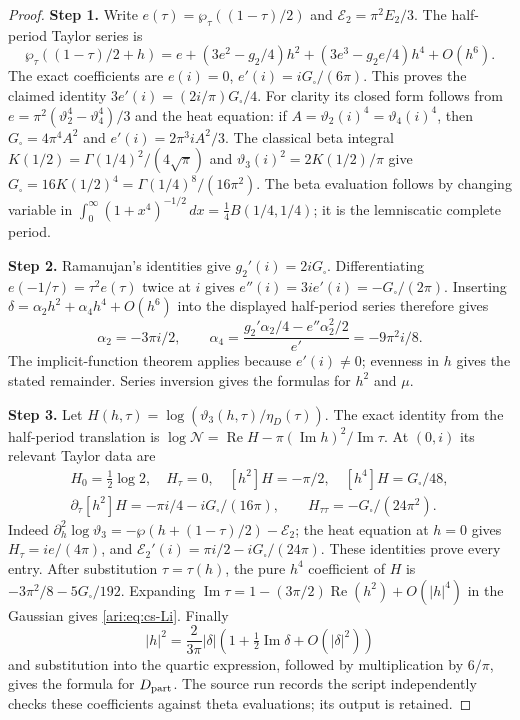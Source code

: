 \documentclass[11pt,a4paper]{article}
\theoremstyle{plain}
\theoremstyle{definition}
\begin{document}
\begin{proof}
\noindent\textbf{Step 1.} Write $e(\tau)=\wp_\tau((1-\tau)/2)$ and
$\mathcal E_2=\pi^2E_2/3$. The half-period Taylor series is
\[
 \wp_\tau((1-\tau)/2+h)
 =e+(3e^2-g_2/4)h^2+(3e^3-g_2e/4)h^4+O(h^6).
\]
The exact coefficients are
$e(i)=0$, $e'(i)=iG_\square/(6\pi)$. This proves the claimed identity
$3e'(i)=(2i/\pi)G_\square/4$. For clarity its closed form follows from
$e=\pi^2(\vartheta_2^4-\vartheta_4^4)/3$ and the heat equation:
if $A=\vartheta_2(i)^4=\vartheta_4(i)^4$, then
$G_\square=4\pi^4A^2$ and $e'(i)=2\pi^3iA^2/3$.
The classical beta integral
$K(1/2)=\Gamma(1/4)^2/(4\sqrt\pi)$ and
$\vartheta_3(i)^2=2K(1/2)/\pi$ give
$G_\square=16K(1/2)^4=\Gamma(1/4)^8/(16\pi^2)$.
The beta evaluation follows by changing variable in
$\int_0^\infty(1+x^4)^{-1/2}\,dx
=\tfrac14 B(1/4,1/4)$; it is the lemniscatic complete period.


\noindent\textbf{Step 2.} Ramanujan's identities give $g_2'(i)=2iG_\square$. Differentiating
$e(-1/\tau)=\tau^2 e(\tau)$ twice at $i$ gives
$e''(i)=3i e'(i)=-G_\square/(2\pi)$. Inserting
$\delta=\alpha_2h^2+\alpha_4h^4+O(h^6)$ into the displayed half-period series
therefore gives
\[
 \alpha_2=-3\pi i/2,\qquad
 \alpha_4=\frac{g_2'\alpha_2/4-e''\alpha_2^2/2}{e'}=-9\pi^2i/8.
\]
The implicit-function theorem applies because $e'(i)\ne0$;
evenness in $h$ gives the stated remainder. Series inversion gives
the formulas for $h^2$ and $\mu$.


\noindent\textbf{Step 3.} Let $H(h,\tau)=\log(\vartheta_3(h,\tau)/\eta_D(\tau))$. The exact
identity from the half-period translation is
$\log \mathcal N=\operatorname{Re}H-\pi(\operatorname{Im}h)^2/
\operatorname{Im}\tau$. At $(0,i)$ its relevant Taylor data are
\[
 \begin{gathered}
 H_0=\tfrac12\log2,\quad H_\tau=0,\quad
 [h^2]H=-\pi/2,\quad [h^4]H=G_\square/48,\\
 \partial_\tau[h^2]H=-\pi i/4-iG_\square/(16\pi),\qquad
 H_{\tau\tau}=-G_\square/(24\pi^2).
 \end{gathered}
\]
Indeed $\partial_h^2\log\vartheta_3=-\wp(h+(1-\tau)/2)-\mathcal E_2$;
the heat equation at $h=0$ gives $H_\tau=ie/(4\pi)$, and
$\mathcal E_2'(i)=\pi i/2-iG_\square/(24\pi)$. These identities prove every entry.
After substitution $\tau=\tau(h)$, the pure $h^4$ coefficient of
$H$ is $-3\pi^2/8-5G_\square/192$. Expanding
$\operatorname{Im}\tau=1-(3\pi/2)\operatorname{Re}(h^2)+O(|h|^4)$
in the Gaussian gives \eqref{ari:eq:cs-Li}. Finally
\[
 |h|^2=\frac{2}{3\pi}|\delta|
          \left(1+\tfrac12\operatorname{Im}\delta+O(|\delta|^2)\right)
\]
and substitution into the quartic expression, followed by
multiplication by $6/\pi$, gives the formula for $D_{\rm part}$.
The source run records the script  independently checks
these coefficients against theta evaluations; its output is retained.
\end{proof}
\end{document}

